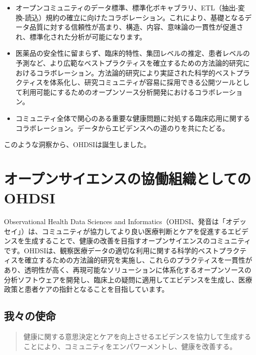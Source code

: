 \documentclass[
  11pt]{book}
\providecommand{\tightlist}{%
  \setlength{\itemsep}{0pt}\setlength{\parskip}{0pt}}
\theoremstyle{definition}
\theoremstyle{definition}
\theoremstyle{definition}
\theoremstyle{definition}
\theoremstyle{remark}
\begin{document}
\begin{itemize}
\tightlist
\item
  オープンコミュニティのデータ標準、標準化ボキャブラリ、ETL（抽出-変換-読込）規約の確立に向けたコラボレーション。これにより、基礎となるデータ品質に対する信頼性が高まり、構造、内容、意味論の一貫性が促進され、標準化された分析が可能になります。
\item
  医薬品の安全性に留まらず、臨床的特性、集団レベルの推定、患者レベルの予測など、より広範なベストプラクティスを確立するための方法論的研究におけるコラボレーション。方法論的研究により実証された科学的ベストプラクティスを体系化し、研究コミュニティが容易に採用できる公開ツールとして利用可能にするためのオープンソース分析開発におけるコラボレーション。
\item
  コミュニティ全体で関心のある重要な健康問題に対処する臨床応用に関するコラボレーション。データからエビデンスへの道のりを共にたどる。
\end{itemize}

このような洞察から、OHDSIは誕生しました。

\section{オープンサイエンスの協働組織としてのOHDSI}\label{ux30aaux30fcux30d7ux30f3ux30b5ux30a4ux30a8ux30f3ux30b9ux306eux5354ux50cdux7d44ux7e54ux3068ux3057ux3066ux306eohdsi}

Observational Health Data Sciences and Informatics（OHDSI、発音は「オデッセイ」）は、コミュニティが協力してより良い医療判断とケアを促進するエビデンスを生成することで、健康の改善を目指すオープンサイエンスのコミュニティです\citep{Hripcsak2015}。OHDSIは、観察医療データの適切な利用に関する科学的ベストプラクティスを確立するための方法論的研究を実施し、これらのプラクティスを一貫性があり、透明性が高く、再現可能なソリューションに体系化するオープンソースの分析ソフトウェアを開発し、臨床上の疑問に適用してエビデンスを生成し、医療政策と患者ケアの指針となることを目指しています。

\subsection{我々の使命}\label{ux6211ux3005ux306eux4f7fux547d}

\begin{quote}
健康に関する意思決定とケアを向上させるエビデンスを協力して生成することにより、コミュニティをエンパワーメントし、健康を改善する。 
\end{quote}
\end{document}
